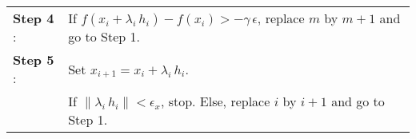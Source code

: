 \begin{minipage}[b]{\textwidth}
\begin{algorithm}
{\begin{equation}
\end{equation}
\vspace{-1ex}
\begin{tabularx}{\headwidth}{m{2cm}l}
\textbf{Step 4} :
     & If $f(x_i + \lambda_i \, h_i) - f(x_i) > - \gamma \, \epsilon$, 
     replace $m$ by $m+1$ and go to Step 1.\\
\textbf{Step 5} :
     & Set $x_{i+1} = x_i + \lambda_i \, h_i$.\\
     & If $\| \lambda_i \, h_i \| < \epsilon_x$, stop. Else, replace $i$ by $i+1$ and go to Step 1.\\ 
\hline
\end{tabularx}
}
~\\ 
\end{algorithm}
\end{minipage}

